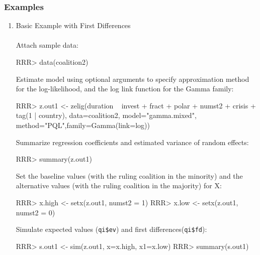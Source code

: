 \subsubsection{Examples}

\begin{enumerate}
\item Basic Example with First Differences \\
\\
Attach sample data: \\
\begin{Schunk}
\begin{Sinput}
RRR> data(coalition2)
\end{Sinput}
\end{Schunk}

Estimate model using optional arguments to specify approximation method for the log-likelihood, and the log link function for the Gamma family:
\begin{Schunk}
\begin{Sinput}
RRR> z.out1 <- zelig(duration ~ invest + fract + polar + numst2 + crisis + tag(1 | country), data=coalition2, model="gamma.mixed", method="PQL",family=Gamma(link=log))
\end{Sinput}
\end{Schunk}

\noindent Summarize regression coefficients and estimated variance of random effects:\\
\begin{Schunk}
\begin{Sinput}
RRR> summary(z.out1)
\end{Sinput}
\end{Schunk}

Set the baseline values (with the ruling coalition in the minority) and the alternative values (with the ruling coalition in the majority) for X:\\
\begin{Schunk}
\begin{Sinput}
RRR> x.high <- setx(z.out1, numst2 = 1)
RRR> x.low <- setx(z.out1, numst2 = 0)
\end{Sinput}
\end{Schunk}

Simulate expected values ({\tt qi\$ev}) and first differences({\tt qi\$fd}): \\
\begin{Schunk}
\begin{Sinput}
RRR> s.out1 <- sim(z.out1, x=x.high, x1=x.low)
RRR> summary(s.out1)
\end{Sinput}
\end{Schunk}

\end{enumerate}

